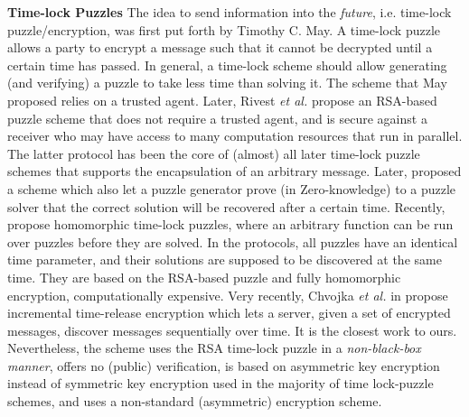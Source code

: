 

\noindent\textbf{Time-lock Puzzles}
The idea to send information into the \emph{future}, i.e.
time-lock puzzle/encryption, was first put forth by Timothy C. May. A time-lock puzzle allows a party to encrypt a message such that it cannot be decrypted  until a certain  time has passed. In general,  a  time-lock scheme should allow   generating (and verifying) a puzzle to take less time than solving it. The  scheme that May proposed relies on a trusted agent. Later, Rivest \textit{et al.} \cite{Rivest:1996:TPT:888615} propose an RSA-based puzzle scheme that does not require a trusted agent, and is secure against a receiver
who may have access to many  computation resources that run in parallel. The latter protocol has been the core of (almost) all later time-lock puzzle schemes that supports the encapsulation of an arbitrary message. Later, \cite{BonehN00,DBLP:conf/fc/GarayJ02} proposed a scheme which also let a puzzle generator  prove (in Zero-knowledge)  to a puzzle solver that the correct solution  will be recovered after a certain time.    Recently, \cite{MalavoltaT19,BrakerskiDGM19}  propose  homomorphic time-lock puzzles, where an arbitrary function can be run over puzzles before they are solved. In the protocols, all puzzles have an identical time parameter, and their solutions are supposed to be discovered at the same time. They  are based on the RSA-based puzzle  and   fully homomorphic encryption,  computationally expensive. Very recently, Chvojka \textit{et al.} in \cite{ChvojkaJSS20} propose  incremental time-release encryption which lets a server, given a set of encrypted messages, discover messages sequentially over time. It is the closest work to ours. Nevertheless, the scheme uses the RSA time-lock puzzle \cite{Rivest:1996:TPT:888615} in a \emph{non-black-box manner}, offers no (public) verification,  is based on  asymmetric key encryption instead of symmetric key encryption used in the majority of time lock-puzzle schemes, and uses a non-standard (asymmetric) encryption scheme. 




